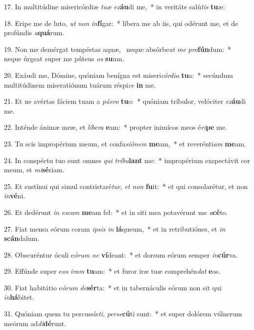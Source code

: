 17. In multitúdine misericórdiæ \textit{tu}\textit{æ} \textit{ex}\textbf{áu}di me,~*  in veritáte salú\textit{tis} \textbf{tu}æ:\

18. Eripe me de luto, \textit{ut} \textit{non} \textit{in}\textbf{fí}gar:~*  líbera me ab iis, qui odérunt me, et de profúndis \textit{a}\textbf{quá}rum.\

19. Non me demérgat tempéstas aquæ, \dag\  neque absórbe\textit{at} \textit{me} \textit{pro}\textbf{fún}dum:~*  neque úrgeat super me púteus \textit{os} \textbf{su}um.\

20. Exáudi me, Dómine, quóniam benígna est miseri\textit{cór}\textit{di}\textit{a} \textbf{tu}a:~*  secúndum multitúdinem miseratiónum tuárum réspi\textit{ce} \textbf{in} me.\

21. Et ne avértas fáciem tuam a \textit{pú}\textit{e}\textit{ro} \textbf{tu}o:~*  quóniam tríbulor, velóciter \textit{ex}\textbf{áu}di me.\

22. Inténde ánimæ meæ, et \textit{lí}\textit{be}\textit{ra} \textbf{e}am:~*  propter inimícos meos é\textit{ri}\textbf{pe} me.\

23. Tu scis impropérium meum, et confu\textit{si}\textit{ó}\textit{nem} \textbf{me}am,~*  et reverénti\textit{am} \textbf{me}am.\

24. In conspéctu tuo sunt omnes \textit{qui} \textit{trí}\textit{bu}\textbf{lant} me:~*  impropérium exspectávit cor meum, et \textit{mi}\textbf{sé}riam.\

25. Et sustínui qui simul contristaré\textit{tur}, \textit{et} \textit{non} \textbf{fu}it:~*  et qui consolarétur, et non \textit{in}\textbf{vé}ni.\

26. Et dedérunt \textit{in} \textit{es}\textit{cam} \textbf{me}am fel:~*  et in siti mea potavérunt me \textit{a}\textbf{cé}to.\

27. Fiat mensa eórum coram \textit{ip}\textit{sis} \textit{in} \textbf{lá}queum,~*  et in retributiónes, et \textit{in} \textbf{scán}dalum.\

28. Obscuréntur óculi e\textit{ó}\textit{rum} \textit{ne} \textbf{ví}deant:~*  et dorsum eórum semper \textit{in}\textbf{cúr}va.\

29. Effúnde super e\textit{os} \textit{i}\textit{ram} \textbf{tu}am:~*  et furor iræ tuæ comprehén\textit{dat} \textbf{e}os.\

30. Fiat habitátio e\textit{ó}\textit{rum} \textit{de}\textbf{sér}ta:~*  et in tabernáculis eórum non sit qui \textit{in}\textbf{há}bitet.\

31. Quóniam quem tu percussís\textit{ti}, \textit{per}\textit{se}\textbf{cú}ti sunt:~*  et super dolórem vúlnerum meórum ad\textit{di}\textbf{dé}runt.\

